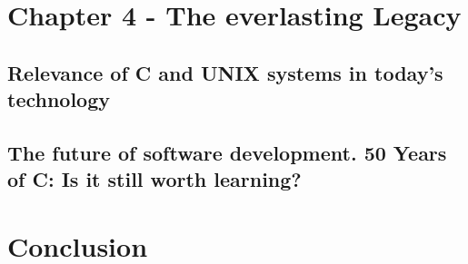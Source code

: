 \documentclass[12pt]{article}
\begin{document}
\newpage
\section{Chapter 4 - The everlasting Legacy}
\subsection{Relevance of C and UNIX systems in today's technology}

\newpage
\subsection{The future of software development. 50 Years of C: Is it still worth learning?}

\newpage
\section{Conclusion}
\end{document}
